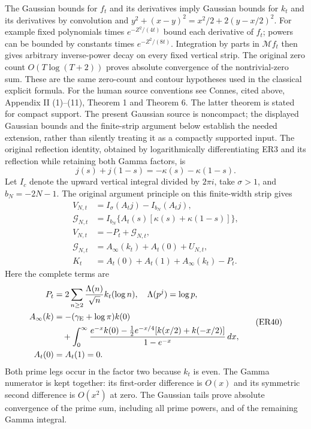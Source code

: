 The Gaussian bounds for \(f_t\) and its derivatives imply Gaussian
bounds for \(k_t\) and its derivatives by convolution and
\(y^2+(x-y)^2=x^2/2+2(y-x/2)^2\).
For example fixed polynomials times \(e^{-Z^2/(4t)}\) bound
each derivative of \(f_t\); powers can be bounded by constants
times \(e^{-Z^2/(8t)}\).
Integration by parts in \(\mathcal M f_t\) then gives arbitrary
inverse-power decay on every fixed vertical strip. The original
zero count \(O(T\log(T+2))\) proves absolute convergence of
the nontrivial-zero sum. These are the same zero-count and
contour hypotheses used in the classical explicit formula.
For the human source conventions see Connes, cited above,
Appendix II (1)--(11), Theorem 1 and Theorem 6. The latter theorem
is stated for compact support. The present Gaussian source is
noncompact; the displayed Gaussian bounds and the finite-strip
argument below establish the needed extension, rather than
silently treating it as a compactly supported input.
The original reflection identity, obtained by logarithmically
differentiating ER3 and its reflection while retaining both
Gamma factors, is
\[
 j(s)+j(1-s)=-\kappa(s)-\kappa(1-s).
 \tag{ER38}
\]
Let \(I_c\) denote the upward vertical integral divided by
\(2\pi i\), take \(\sigma>1\), and \(b_N=-2N-1\).
The original argument principle on this finite-width strip gives
\[
 \begin{split}
 V_{N,t}&=I_\sigma(A_tj)-I_{b_N}(A_tj),\\
 \mathcal G_{N,t}
 &=I_{b_N}\{A_t(s)[\kappa(s)+\kappa(1-s)]\},\\
 V_{N,t}&=-P_t+\mathcal G_{N,t},\\
 \mathcal G_{N,t}&=A_\infty(k_t)+A_t(0)+U_{N,t},\\
 K_t&=A_t(0)+A_t(1)+A_\infty(k_t)-P_t .
 \end{split}
 \tag{ER39}
\]
Here the complete terms are
\[
 \begin{split}
 P_t&=2\sum_{n\ge2}\frac{\Lambda(n)}{\sqrt n}k_t(\log n),
 \quad \Lambda(p^j)=\log p,\\
 A_\infty(k)&=-(\gamma_{\rm E}+\log\pi)k(0)\\
 &\quad+\int_0^\infty
 \frac{e^{-x}k(0)-\tfrac12e^{-x/4}
               [k(x/2)+k(-x/2)]}{1-e^{-x}}\,dx,\\
 A_t(0)&=A_t(1)=0 .
 \end{split}
 \tag{ER40}
\]
Both prime legs occur in the factor two because \(k_t\) is even.
The Gamma numerator is kept together: its first-order difference
is \(O(x)\) and its symmetric second difference is \(O(x^2)\)
at zero. The Gaussian tails prove absolute convergence of the
prime sum, including all prime powers, and of the remaining
Gamma integral.

